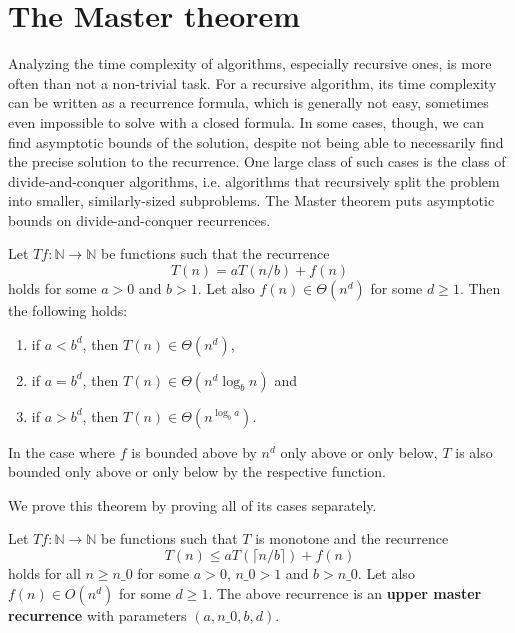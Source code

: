 \section{The Master theorem}

Analyzing the time complexity of algorithms, especially recursive ones, is more often 
than not a non-trivial task. For a recursive algorithm, its time complexity can be 
written as a recurrence formula, which is generally not easy, sometimes even impossible 
to solve with a closed formula. In some cases, though, we can find asymptotic bounds 
of the solution, despite not being able to necessarily find the 
precise solution to the recurrence. One large class of such cases is the class of 
divide-and-conquer algorithms, i.e. algorithms that recursively split the
problem into smaller, similarly-sized subproblems. The Master theorem puts asymptotic 
bounds on divide-and-conquer recurrences.

\begin{theorem}
    Let $T f : \mathbb{N} \rightarrow \mathbb{N}$ be functions such that the recurrence
    \[
        T(n) = a T(n/b) + f(n)
    \]
    holds for some $a > 0$ and $b > 1$. Let also $f(n) \in \Theta(n^d)$ for some $d \ge 1$. 
    Then the following holds:
    \begin{enumerate}
        \item if $a < b^d$, then $T(n) \in \Theta(n^d)$,
        \item if $a = b^d$, then $T(n) \in \Theta(n^d \log_b{n})$ and
        \item if $a > b^d$, then $T(n) \in \Theta(n^{\log_b{a}})$.
    \end{enumerate}
    In the case where $f$ is bounded above by $n^d$ only above or only below,
    $T$ is also bounded only above or only below by the respective function.
\end{theorem}

We prove this theorem by proving all of its cases separately. 

\begin{definition}
    \label{def:upper_master_rec}
    \leanok
    Let $T f : \mathbb{N} \rightarrow \mathbb{N}$ be functions such that $T$ 
    is monotone and the recurrence
    \[
        T(n) \leq a T(\lceil n/b \rceil) + f(n)
    \]
    holds for all $n \ge n\_0$ for some $a > 0$, $n\_0 > 1$ and $b > n\_0$. 
    Let also $f(n) \in O(n^d)$ for some $d \ge 1$. The above recurrence 
    is an \textbf{upper master recurrence} with parameters $(a, n\_0, b, d)$.
\end{definition}

